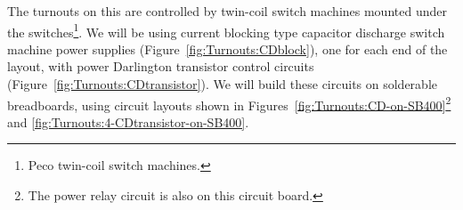 The turnouts on this are controlled by twin-coil switch machines
mounted under the switches\footnote{Peco twin-coil switch machines.}.
We will be using current blocking type capacitor discharge switch
machine power supplies (Figure~\ref{fig:Turnouts:CDblock}), one for
each end of the layout, with power Darlington transistor control
circuits (Figure~\ref{fig:Turnouts:CDtransistor}).  We will build these
circuits on solderable breadboards, using circuit layouts shown in
Figures~\ref{fig:Turnouts:CD-on-SB400}\footnote{The power relay circuit
is also on this circuit board.} and \ref{fig:Turnouts:4-CDtransistor-on-SB400}. 

